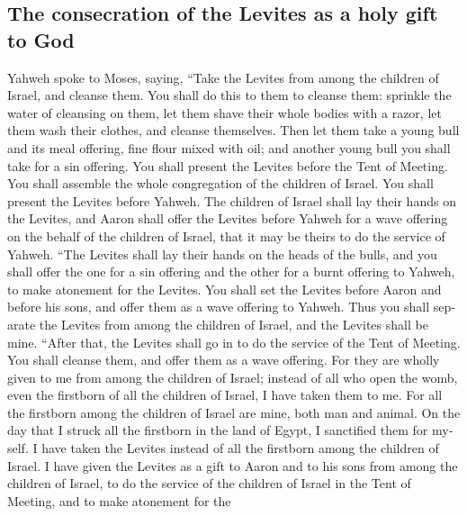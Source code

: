 \begin{paracol}{2}
\begin{otherlanguage}{english}
\hypertarget{the-consecration-of-the-levites-as-a-holy-gift-to-god}{%
\subsection{The consecration of the Levites as a holy gift to
God}\label{the-consecration-of-the-levites-as-a-holy-gift-to-god}}

 Yahweh spoke to Moses, saying,  ``Take the
Levites from among the children of Israel, and cleanse them.
 You shall do this to them to cleanse them: sprinkle the
water of cleansing on them, let them shave their whole bodies with a
razor, let them wash their clothes, and cleanse themselves.
 Then let them take a young bull and its meal offering,
fine flour mixed with oil; and another young bull you shall take for a
sin offering.  You shall present the Levites before the
Tent of Meeting. You shall assemble the whole congregation of the
children of Israel.  You shall present the Levites before
Yahweh. The children of Israel shall lay their hands on the Levites,
 and Aaron shall offer the Levites before Yahweh for a
wave offering on the behalf of the children of Israel, that it may be
theirs to do the service of Yahweh.  ``The Levites shall
lay their hands on the heads of the bulls, and you shall offer the one
for a sin offering and the other for a burnt offering to Yahweh, to make
atonement for the Levites.  You shall set the Levites
before Aaron and before his sons, and offer them as a wave offering to
Yahweh.  Thus you shall separate the Levites from among
the children of Israel, and the Levites shall be mine. 
``After that, the Levites shall go in to do the service of the Tent of
Meeting. You shall cleanse them, and offer them as a wave offering.
 For they are wholly given to me from among the children
of Israel; instead of all who open the womb, even the firstborn of all
the children of Israel, I have taken them to me.  For all
the firstborn among the children of Israel are mine, both man and
animal. On the day that I struck all the firstborn in the land of Egypt,
I sanctified them for myself.  I have taken the Levites
instead of all the firstborn among the children of Israel.
 I have given the Levites as a gift to Aaron and to his
sons from among the children of Israel, to do the service of the
children of Israel in the Tent of Meeting, and to make atonement for the

\end{otherlanguage}
\end{paracol}

